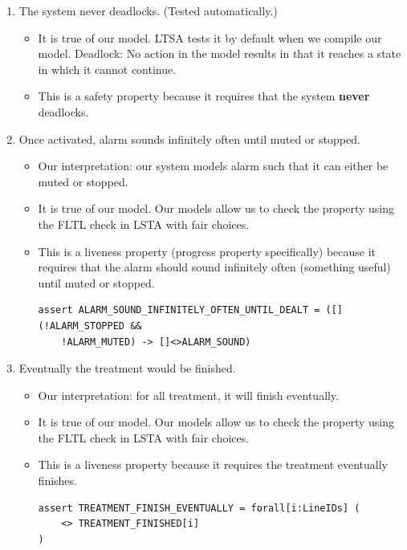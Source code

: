 \documentclass[titlepage]{article}
\begin{document}
\begin{enumerate}
\item The system never deadlocks. (Tested automatically.)
    \begin{itemize}
        \item It is true of our model. LTSA tests it by default when we compile our model. Deadlock: No action in the model results in that it reaches a state in which it cannot continue.
        \item This is a safety property because it requires that the system \textbf{never} deadlocks.
    \end{itemize}

\item Once activated, alarm sounds infinitely often until muted or stopped.
    \begin{itemize}
        \item Our interpretation: our system models alarm such that it can either be muted or stopped.
        \item It is true of our model. Our models allow us to check the property using the FLTL check in LSTA with fair choices.
        \item This is a liveness property (progress property specifically) because it requires that the alarm should sound infinitely often (something useful) until muted or stopped.
            \begin{verbatim}
assert ALARM_SOUND_INFINITELY_OFTEN_UNTIL_DEALT = ([](!ALARM_STOPPED &&
    !ALARM_MUTED) -> []<>ALARM_SOUND)
            \end{verbatim}
        \end{itemize}

\item Eventually the treatment would be finished.
    \begin{itemize}
        \item Our interpretation: for all treatment, it will finish eventually.
        \item It is true of our model. Our models allow us to check the property using the FLTL check in LSTA with fair choices.
        \item This is a liveness property because it requires the treatment eventually finishes.
            \begin{verbatim}
assert TREATMENT_FINISH_EVENTUALLY = forall[i:LineIDs] (
    <> TREATMENT_FINISHED[i]
)
            \end{verbatim}
    \end{itemize}

\end{enumerate}
\end{document}
